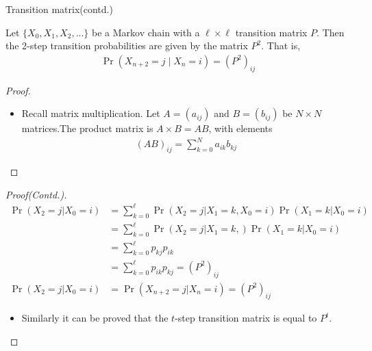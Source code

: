 \documentclass{beamer}
\providecommand{\pr}[1]{\ensuremath{\Pr\left(#1\right)}}
\begin{document}
\begin{frame}{Transition matrix(contd.)}
    \begin{theorem}
    Let $\{X_0, X_1, X_2, . . .\}$ be a Markov chain with a $\ell \times \ell $ transition matrix $P$. Then the 2-step transition probabilities are given by the matrix $P^2$. That is,
    \begin{align}
        \pr{X_{n+2}=j\mid X_{n}=i}	= (P^2)_{ij}
    \end{align}
    \end{theorem}
    \begin{proof}
    \begin{itemize}
        \item Recall matrix multiplication. Let $A = (a_{ij} )$ and $B = (b_{ij})$ be $N \times N$ matrices.The product matrix is $A \times B = AB$, with elements
        \begin{align}
            (AB)_{ij}= \sum\limits_{k=0}^N a_{ik}b_{kj}
        \end{align}
        \end{itemize}
    \end{proof}
\end{frame}
\begin{frame}{}
    \begin{proof}[Proof(Contd.)]
        \vspace{-5mm}
        \begin{align}
            \pr{X_{2}=j | X_0=i}&=\sum\limits_{k=0}^\ell \pr{X_{2}=j | X_{1}=k, X_0=i}\pr{X_{1}=k | X_0=i}\\
            &=\sum\limits_{k=0}^\ell \pr{X_{2}=j | X_{1}=k,}\pr{X_{1}=k | X_0=i}\\
            &=\sum\limits_{k=0}^\ell p_{kj}p_{ik}\\
            &=\sum\limits_{k=0}^\ell p_{ik}p_{kj}       =(P^2)_{ij}\\
            \pr{X_{2}=j | X_0=i}&=\pr{X_{n+2}=j | X_n=i}=(P^2)_{ij}
        \end{align}
        \vspace{-8mm}
        \begin{itemize}
            \item Similarly it can be proved that the $t$-step transition matrix is equal to $P^t$.
        \end{itemize}
    \end{proof}
\end{frame}
\end{document}
